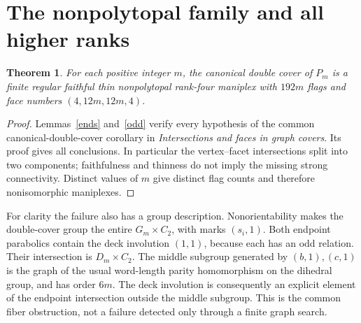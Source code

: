 \documentclass[a4paper,11pt]{article}
\newtheorem{theorem}{Theorem}\newtheorem{lemma}[theorem]{Lemma}\newtheorem{proposition}[theorem]{Proposition}
\begin{document}
\section{The nonpolytopal family and all higher ranks}
\begin{theorem}\label{main}
For each positive integer $m$, the canonical double cover of $P_m$ is
a finite regular faithful thin nonpolytopal rank-four maniplex with
$192m$ flags and face numbers $(4,12m,12m,4)$.
\end{theorem}
\begin{proof}
Lemmas~\ref{ends} and~\ref{odd} verify every hypothesis of the common
canonical-double-cover corollary in \emph{Intersections and faces in
graph covers}. Its proof gives all conclusions. In particular the
vertex--facet intersections split into two components; faithfulness and
thinness do not imply the missing strong connectivity. Distinct values
of $m$ give distinct flag counts and therefore nonisomorphic maniplexes.
\end{proof}

For clarity the failure also has a group description. Nonorientability
makes the double-cover group the entire $G_m\times C_2$, with marks
$(s_i,1)$. Both endpoint parabolics contain the deck involution
$(1,1)$, because each has an odd relation. Their intersection is
$D_m\times C_2$. The middle subgroup generated by $(b,1),(c,1)$ is
the graph of the usual word-length parity homomorphism on the dihedral
group, and has order $6m$. The deck involution is consequently an
explicit element of the endpoint intersection outside the middle
subgroup. This is the common fiber obstruction, not a failure detected
only through a finite graph search.
\end{document}
